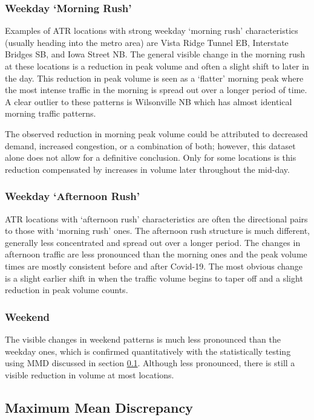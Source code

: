 \documentclass{article}
\begin{document}
\subsubsection{Weekday `Morning Rush'}

Examples of ATR locations with strong weekday `morning rush' characteristics (usually heading into the metro area) are Vista Ridge Tunnel EB, Interstate Bridges SB, and Iowa Street NB. The general visible change in the morning rush at these locations is a reduction in peak volume and often a slight shift to later in the day. This reduction in peak volume is seen as a `flatter' morning peak where the most intense traffic in the morning is spread out over a longer period of time. A clear outlier to these patterns is Wilsonville NB which has almost identical morning traffic patterns. 

The observed reduction in morning peak volume could be attributed to decreased demand, increased congestion, or a combination of both; however, this dataset alone does not allow for a definitive conclusion. Only for some locations is this reduction compensated by increases in volume later throughout the mid-day.

\subsubsection{Weekday `Afternoon Rush'}

ATR locations with `afternoon rush' characteristics are often the directional pairs to those with `morning rush' ones. The afternoon rush structure is much different, generally less concentrated and spread out over a longer period. The changes in afternoon traffic are less pronounced than the morning ones and the peak volume times are mostly consistent before and after Covid-19. The most obvious change is a slight earlier shift in when the traffic volume begins to taper off and a slight reduction in peak volume counts.

\subsubsection{Weekend}

The visible changes in weekend patterns is much less pronounced than the weekday ones, which is confirmed quantitatively with the statistically testing using MMD discussed in section \ref{sec:mmd_results}. Although less pronounced, there is still a visible reduction in volume at most locations. 

\subsection{Maximum Mean Discrepancy} \label{sec:mmd_results}
\end{document}
